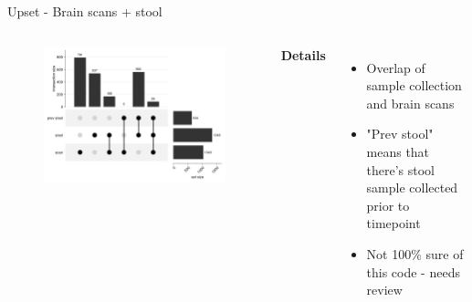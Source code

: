 \begin{frame}{Upset - Brain scans + stool}
    \begin{columns}[c] %

    
        \begin{figure}
        \includegraphics[width=1\linewidth]{../figures/upset_scan_stool.png}
        \end{figure}

    
        \textbf{Details}
        \begin{itemize}
            \item Overlap of sample collection and brain scans
            \item "Prev stool" means that there's stool sample collected prior to timepoint
            \item Not 100\% sure of this code - needs review
        \end{itemize}

    \end{columns}

\end{frame}



